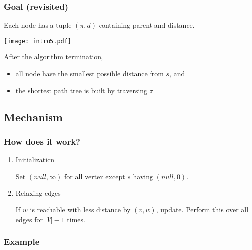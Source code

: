 \documentclass{beamer}
\begin{document}
\begin{frame}\frametitle{Goal (revisited)}

Each node has a tuple $(\pi,d)$ containing parent and distance.

\texttt{[image: intro5.pdf]}

After the algorithm termination,
\begin{itemize}
\item all node have the smallest possible distance from $s$, and
\item the shortest path tree is built by traversing $\pi$
\end{itemize}

\end{frame}

\subsection{Mechanism}

\begin{frame}\frametitle{How does it work?}

\begin{enumerate}

\item \alert{Initialization}

Set $(null,\infty)$ for all vertex except $s$ having $(null,0)$.\newline

\pause

\item \alert{Relaxing edges}

If $w$ is reachable with less distance by $(v,w)$, update. Perform this
over all edges for $|V|-1$ times.

\begin{center}
\end{center}

\pause

\end{enumerate}

\end{frame}

\begin{frame}\frametitle{Example}


\end{frame}
\end{document}
